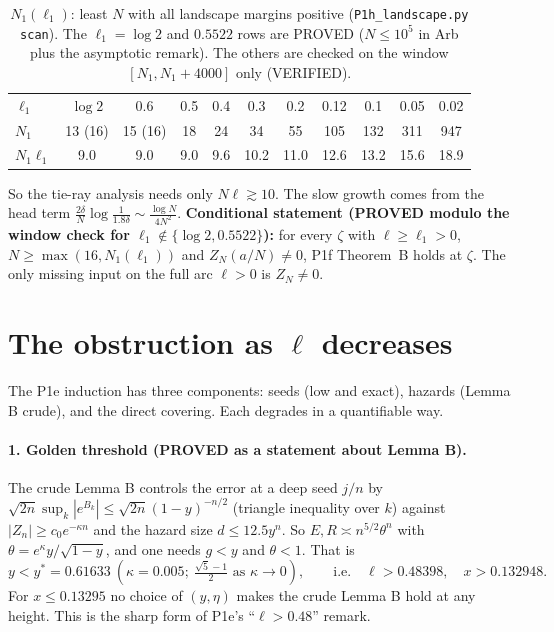 \documentclass[11pt]{article}
\theoremstyle{remark}\newtheorem{remark}[theorem]{Remark}
\begin{document}
\begin{table}[h]\centering\small
\caption{$N_1(\ell_1)$: least $N$ with all landscape margins positive (\texttt{P1h\_landscape.py scan}). The $\ell_1=\log2$ and $0.5522$ rows are PROVED ($N\le10^5$ in Arb plus the asymptotic remark). The others are checked on the window $[N_1,N_1+4000]$ only (VERIFIED).}\label{tab:N1}
\begin{tabular}{lcccccccccc}\toprule
$\ell_1$ & $\log 2$ & 0.6 & 0.5 & 0.4 & 0.3 & 0.2 & 0.12 & 0.1 & 0.05 & 0.02\\
$N_1$ & 13 (16) & 15 (16) & 18 & 24 & 34 & 55 & 105 & 132 & 311 & 947\\
$N_1\ell_1$ & 9.0 & 9.0 & 9.0 & 9.6 & 10.2 & 11.0 & 12.6 & 13.2 & 15.6 & 18.9\\\bottomrule
\end{tabular}\end{table}
So the tie-ray analysis needs only $N\ell\gtrsim10$. The slow growth comes from the head term $\frac{2\delta}N\log\frac1{1.8\delta}\sim\frac{\log N}{4N^2}$. \textbf{Conditional statement (PROVED modulo the window check for $\ell_1\notin\{\log2,0.5522\}$):} for every $\zeta$ with $\ell\ge\ell_1>0$, $N\ge\max(16,N_1(\ell_1))$ and $Z_N(a/N)\ne0$, P1f Theorem~B holds at $\zeta$. The only missing input on the full arc $\ell>0$ is $Z_N\ne0$.

\section{The obstruction as $\ell$ decreases}\label{sec:obs}
The P1e induction has three components: seeds (low and exact), hazards (Lemma B crude), and the direct covering. Each degrades in a quantifiable way.

\paragraph{1. Golden threshold (PROVED as a statement about Lemma B).} The crude Lemma B controls the error at a deep seed $j/n$ by $\sqrt{2n}\sup_k|e^{B_k}|\le\sqrt{2n}(1-y)^{-n/2}$ (triangle inequality over $k$) against $|Z_n|\ge c_0e^{-\kappa n}$ and the hazard size $d\le12.5y^n$. So $E,R\asymp n^{5/2}\theta^n$ with $\theta=e^\kappa y/\sqrt{1-y}$, and one needs $g<y$ and $\theta<1$. That is
\[y<y^*=0.61633\ (\kappa=0.005;\ \tfrac{\sqrt5-1}2\text{ as }\kappa\to0),\qquad\text{i.e.}\quad\ell>0.48398,\quad x>0.132948 .\]
For $x\le0.13295$ no choice of $(y,\eta)$ makes the crude Lemma B hold at any height. This is the sharp form of P1e's ``$\ell>0.48$'' remark.
\end{document}
